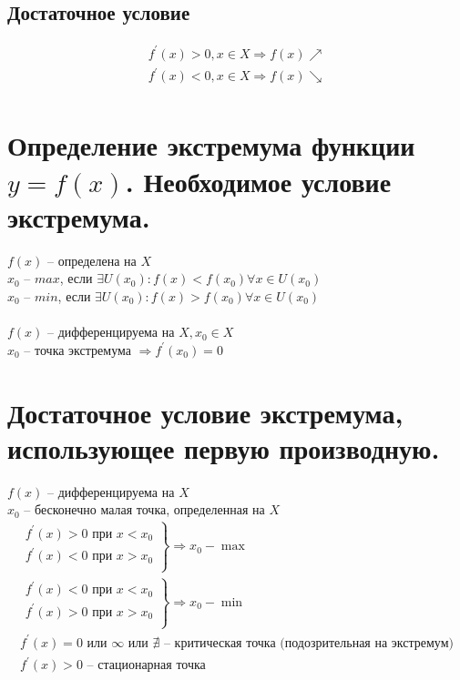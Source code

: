 \documentclass[12pt, fleqn]{article}
\begin{document}
\subsection{Достаточное условие}
\begin{multline*}
	f^\prime(x)>0, x \in X \Rightarrow f(x)\nearrow\\
	f^\prime(x)<0, x\in X \Rightarrow f(x) \searrow\\
\end{multline*}
\section{Определение экстремума функции $y = f (x)$. Необходимое условие экстремума.}
$f(x)$ -- определена на $X$\\
$x_0$ -- $max$, если $\exists U(x_0)\colon f(x)<f(x_0)\forall x \in U(x_0)$\\
$x_0$ -- $min$, если $\exists U(x_0)\colon f(x)>f(x_0)\forall x \in U(x_0)$\\\\
$f(x)$ -- дифференцируема на $X, x_0 \in X$\\
$x_0$ -- точка экстремума $\Rightarrow f^\prime(x_0)=0$
\section{Достаточное условие экстремума, использующее первую производную.}
$f(x)$ -- дифференцируема на $X$\\
$x_0$ -- бесконечно малая точка, определенная на $X$
\begin{multline*}
	\left.
	\begin{gathered}
		f^\prime(x)>0 \text{ при } x<x_0\\
		f^\prime(x)<0 \text{ при } x>x_0\\
	\end{gathered}
	\right\}\Rightarrow x_0 - \max\\
	\left.
	\begin{gathered}
		f^\prime(x)<0 \text{ при } x<x_0\\
		f^\prime(x)>0 \text{ при } x>x_0\\
	\end{gathered}
	\right\}\Rightarrow x_0 - \min\\
	f^\prime(x)=0 \text{ или } \infty  \text{ или } \nexists \text{ -- критическая точка (подозрительная на экстремум)}\\
	f^\prime(x)>0 \text{ -- стационарная точка}\\
\end{multline*}
\end{document}
